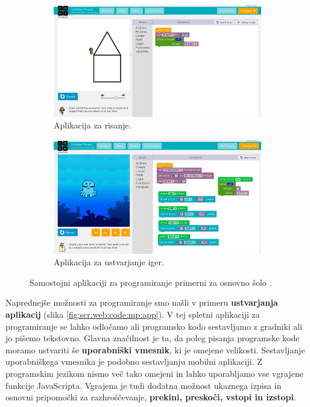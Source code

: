 \begin{figure}[h!]
  \centering
  \begin{subfigure}[]{0.45\textwidth}
    \includegraphics[width=\textwidth]{./images/sc_web/code_cs_draw.png}
    \caption{Aplikacija za risanje.}
  \label{fig:code:mp:draw}
\end{subfigure}
\qquad
\begin{subfigure}[]{0.45\textwidth}
  \includegraphics[width=\textwidth]{./images/sc_web/code_cs_game.png}
  \caption{Aplikacija za ustvarjanje iger.}
\label{fig:code:mp:game}
\end{subfigure}
\caption{Samostojni aplikaciji za programiranje primerni za
  osnovno šolo \cite{web:code.org:studio}.}
\label{fig:web:code:mp:dg}
\end{figure}

Naprednejše možnosti za programiranje smo našli v primeru
\textbf{ustvarjanja aplikacij} (slika
\ref{fig:scr:web:code:mp:app}). V tej spletni aplikaciji za
programiranje se lahko odločamo ali programsko kodo sestavljamo z
gradniki ali jo pišemo tekstovno. Glavna značilnost je ta, da poleg
pisanja programske kode moramo ustvariti še \textbf{uporabniški
  vmesnik}, ki je omejene velikosti. Sestavljanje uporabniškega
vmesnika je podobno sestavljanju mobilni aplikaciji. Z programskim
jezikom nismo več tako omejeni in lahko uporabljamo vse vgrajene
funkcije JavaScripta. Vgrajena je tudi dodatna možnost ukaznega izpisa
in osnovni pripomočki za razhroščevanje, \textbf{prekini, preskoči,
  vstopi in izstopi}.

